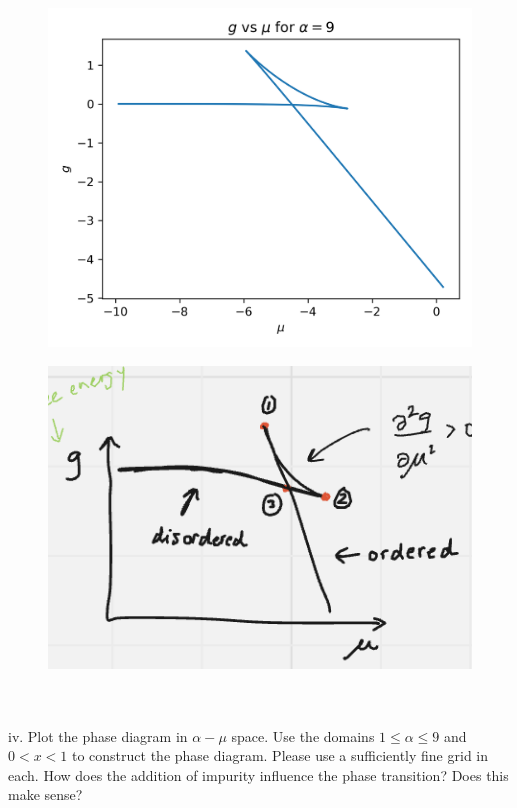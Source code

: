 \documentclass[12pt]{article}
\begin{document}
\begin{figure}
  \centering
  \includegraphics[max width=\textwidth]{g-mu-9.png}  
\end{figure}
\begin{figure}
  \centering
  \includegraphics[max width=\textwidth]{drawing.png}
\end{figure}\\\\

iv. Plot the phase diagram in $\alpha-\mu$ space. Use the domains $1 \leq \alpha \leq 9$ and $0<x<1$ to construct the phase diagram. Please use a sufficiently fine grid in each. How does the addition of impurity influence the phase transition? Does this make sense?
\end{document}
